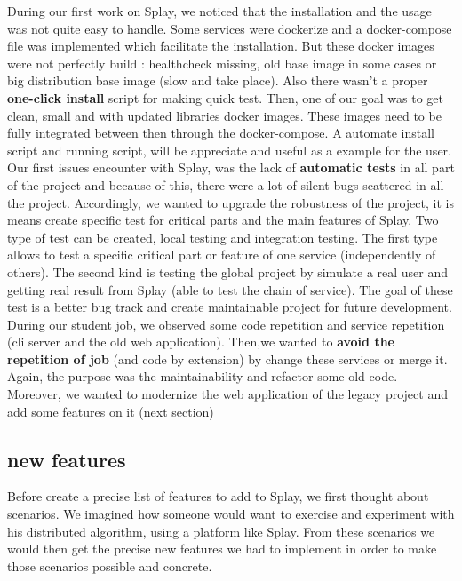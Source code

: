 \documentclass{eplmastersthesis}
\begin{document}
      During our first work on Splay, we noticed that the installation and the
      usage was not quite easy to handle. Some services were dockerize and a
      docker-compose file was implemented which facilitate the installation.
      But these docker images were not perfectly build : healthcheck missing,
      old base image in some cases or big distribution base image (slow and
      take place). Also there wasn't a proper \textbf{one-click install}
      script for making quick test. Then, one of our goal was to get clean,
      small and with updated libraries docker images. These images need to be
      fully integrated between then through the docker-compose. A automate
      install script and running script, will be appreciate and useful as a
      example for the user.\\

      Our first issues encounter with Splay, was the lack of
      \textbf{automatic tests} in all part of the project and because of this,
      there were a lot of silent bugs scattered in all the project.
      Accordingly, we wanted to upgrade the robustness of the project,
      it is means create specific test for critical parts and the main features
      of Splay. Two type of test can be created, local testing and integration
      testing. The first type allows to test a specific critical part or
      feature of one service (independently of others). The second kind is
      testing the global project by simulate a real user and getting real
      result from Splay (able to test the chain of service). The goal of these
      test is a better bug track and create maintainable project for future
      development.\\

      During our student job, we observed some code repetition and service
      repetition (cli server and the old web application). Then,we wanted
      to \textbf{avoid the repetition of job} (and code by extension) by
      change these services or merge it. Again, the purpose was the
      maintainability and refactor some old code. Moreover, we wanted to
      modernize the web application of the legacy project and add some
      features on it (next section)

\subsection{new features}  
    Before create a precise list of features to add to Splay, we first
    thought about scenarios. We imagined how someone would want to exercise
    and experiment with his distributed algorithm, using a platform like
    Splay. From these scenarios we would then get the precise new features
    we had to implement in order to make those scenarios possible and
    concrete.\\
\end{document}
